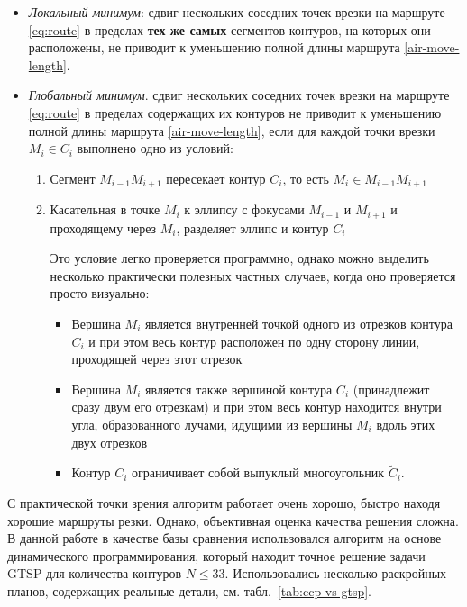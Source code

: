 \begin{itemize}
  \item 
  {\it Локальный минимум}:
  сдвиг нескольких соседних точек врезки на маршруте \eqref{eq:route}
  в пределах {\bf тех же самых} сегментов контуров,
  на которых они расположены,
  не приводит к уменьшению полной длины маршрута \eqref{air-move-length}.
  \item 
  {\it Глобальный минимум}.
  сдвиг нескольких соседних точек врезки на маршруте \eqref{eq:route}
  в пределах содержащих их контуров
  не приводит к уменьшению полной длины маршрута \eqref{air-move-length},
  если для каждой  точки врезки $M_i \in C_i$ выполнено одно из условий:
  \begin{enumerate}
    \item 
    Сегмент
    $M_{i-1} M_{i+1}$
    пересекает контур
    $C_i$,
    то есть
    $M_i \in M_{i-1} M_{i+1}$
    \item 
    Касательная в точке
    $M_i$
    к эллипсу с фокусами
    $M_{i-1}$
    и
    $M_{i+1}$
    и проходящему через
    $M_i$,
    разделяет эллипс и контур
    $C_i$

    Это условие легко проверяется программно,
    однако можно выделить несколько практически полезных частных случаев, 
    когда оно проверяется просто визуально:
    \begin{itemize}
      \item
      Вершина
      $M_i$
      является внутренней точкой одного из
      отрезков контура
      $C_i$
      и при этом весь контур расположен
      по одну сторону линии,
      проходящей через этот отрезок
      \item
      Вершина
      $M_i$
      является также вершиной контура
      $C_i$
      (принадлежит сразу двум его отрезкам)
      и при этом весь контур находится
      внутри угла,
      образованного лучами,
      идущими из вершины
      $M_i$
      вдоль этих двух отрезков
      \item
      Контур
      $C_i$
      ограничивает собой выпуклый
      многоугольник
      $\widetilde C_i$.
    \end{itemize}
  \end{enumerate}
\end{itemize}

С практической точки зрения
алгоритм работает очень хорошо,
быстро находя хорошие маршруты резки.
Однако, объективная оценка качества решения сложна.
В данной работе в качестве базы сравнения использовался алгоритм
на основе динамического программирования,
который находит точное решение задачи GTSP
для количества контуров
$N \leqslant 33$.
Использовались несколько раскройных планов,
содержащих реальные детали,
см. табл.~\ref{tab:ccp-vs-gtsp}.

